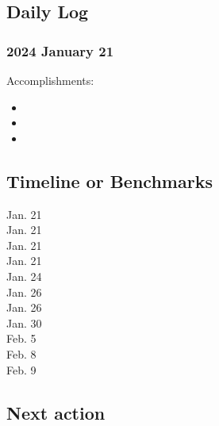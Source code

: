 \documentclass[10pt,letterpaper]{article}
\newcommand{\bi}{\begin{itemize}}
\newcommand{\ei}{\end{itemize}}
\begin{document}

\subsection{Daily Log}
\label{sub:daily-log}


\subsubsection{2024 January 21}

Accomplishments:
\bi
\item 
\item
\item
\ei

\subsection{Timeline or Benchmarks}
\label{sub:benchmarks}



\begin{description}
\item [Jan. 21]
\item [Jan. 21]
\item [Jan. 21] 
\item [Jan. 21] 
\item [Jan. 24] 
\item [Jan. 26]
\item [Jan. 26]
\item [Jan. 30] 
\item [Feb. 5] 
\item [Feb. 8]
\item [Feb. 9]
\end{description}

\subsection{Next action}
\label{sub:next}

\end{document}
